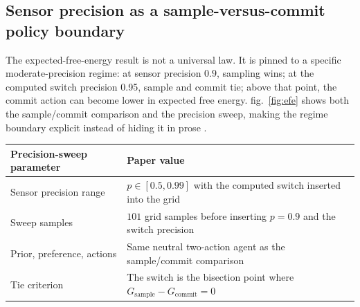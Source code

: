 \documentclass[
  english,
]{article}
\newcounter{none} %
\begin{document}
\subsection{Sensor precision as a sample-versus-commit policy
boundary}\label{sensor-precision-as-a-sample-versus-commit-policy-boundary}

The expected-free-energy result is not a universal law. It is pinned to
a specific moderate-precision regime: at sensor precision \(0.9\),
sampling wins; at the computed switch precision 0.95, sample and commit
tie; above that point, the commit action can become lower in expected
free energy. fig.~\ref{fig:efe} shows both the sample/commit comparison
and the precision sweep, making the regime boundary explicit instead of
hiding it in prose
\citep{millidge2021whence, champion2026reframing, nuijten2026what_type_inference, nuijten2026efe_planning_vi}.

{\def\LTcaptype{none} %
\begin{longtable}[]{@{}
  >{\raggedright\arraybackslash}p{}
  >{\raggedright\arraybackslash}p{}@{}}
\toprule\noalign{}
\begin{minipage}[b]{\linewidth}\raggedright
Precision-sweep parameter
\end{minipage} & \begin{minipage}[b]{\linewidth}\raggedright
Paper value
\end{minipage} \\
\midrule\noalign{}
\endhead
\bottomrule\noalign{}
\endlastfoot
Sensor precision range & \(p \in [0.5,0.99]\) with the computed switch
inserted into the grid \\
Sweep samples & \(101\) grid samples before inserting \(p=0.9\) and the
switch precision \\
Prior, preference, actions & Same neutral two-action agent as the
sample/commit comparison \\
Tie criterion & The switch is the bisection point where
\(G_{\mathrm{sample}}-G_{\mathrm{commit}}=0\) \\
\end{longtable}
}
\end{document}
